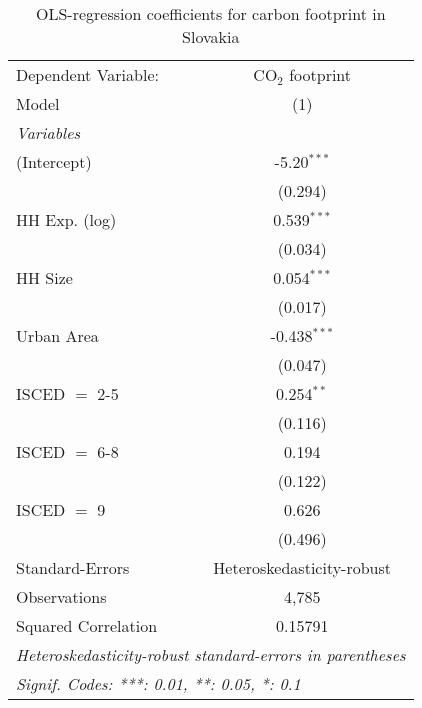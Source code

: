 
\begin{table}[htbp!]
   \centering
   \small
   \begin{adjustbox}{width = 1\textwidth, max height = 0.95\textheight, center}
      \begin{threeparttable}[b]
         \caption{\label{tab:OLS_2_SVK} OLS-regression coefficients for carbon footprint in Slovakia}
         \begin{tabular}{lc}
            \tabularnewline \midrule \midrule
            Dependent Variable: & CO$_{2}$ footprint\\  
            Model               & (1)\\  
            \midrule
            \emph{Variables}\\
            (Intercept)         & -5.20$^{***}$\\   
                                & (0.294)\\   
            HH Exp. (log)       & 0.539$^{***}$\\   
                                & (0.034)\\   
            HH Size             & 0.054$^{***}$\\   
                                & (0.017)\\   
            Urban Area          & -0.438$^{***}$\\   
                                & (0.047)\\   
            ISCED $=$ 2-5       & 0.254$^{**}$\\   
                                & (0.116)\\   
            ISCED $=$ 6-8       & 0.194\\   
                                & (0.122)\\   
            ISCED $=$ 9         & 0.626\\   
                                & (0.496)\\   
            \midrule 
            Standard-Errors     & Heteroskedasticity-robust \\   
            Observations        & 4,785\\  
            Squared Correlation & 0.15791\\  
            \midrule \midrule
            \multicolumn{2}{l}{\emph{Heteroskedasticity-robust standard-errors in parentheses}}\\
            \multicolumn{2}{l}{\emph{Signif. Codes: ***: 0.01, **: 0.05, *: 0.1}}\\
         \end{tabular}
         

\end{threeparttable}
\end{adjustbox}
\end{table}
